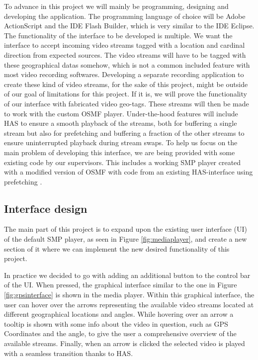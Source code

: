 \documentclass[9pt,a4paper]{acmproc}
\begin{document}
To advance in this project we will mainly be programming, designing and developing the application. The programming language of choice will be Adobe ActionScript and the IDE Flash Builder, which is very similar to the IDE Eclipse. The functionality of the interface to be developed is multiple. We want the interface to accept incoming video streams tagged with a location and cardinal direction from expected sources. The video streams will have to be tagged with these geographical datas somehow, which is not a common included feature with most video recording softwares. Developing a separate recording application to create these kind of video streams, for the sake of this project, might be outside of our goal of limitations for this project. If it is, we will prove the functionality of our interface with fabricated video geo-tags. These streams will then be made to work with the custom OSMF player.  Under-the-hood features will include HAS to ensure a smooth playback of the streams, both for buffering a single stream but also for prefetching and buffering a fraction of the other streams to ensure uninterrupted playback during stream swaps. To help us focus on the main problem of developing this interface, we are being provided with some existing code by our supervisors. This includes a working SMP player created with a modified version of OSMF with code from an existing HAS-interface using prefetching \cite{qualbranch}.

\subsection{Interface design}
The main part of this project is to expand upon the existing user interface (UI) of the default SMP player, as seen in Figure \ref{fig:mediaplayer}, and create a new section of it where we can implement the new desired functionality of this project. 

In practice we decided to go with adding an additional button to the control bar of the UI. When pressed, the graphical interface similar to the one in Figure \ref{fig:gpsinterface} is shown in the media player. Within this graphical interface, the user can hover over the arrows representing the available video streams located at different geographical locations and angles. While hovering over an arrow a tooltip is shown with some info about the video in question, such as GPS Coordinates and the angle, to give the user a comprehensive overview of the available streams. Finally, when an arrow is clicked the selected video is played with a seamless transition thanks to HAS.
\end{document}
